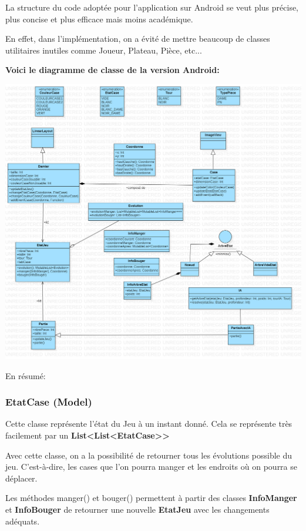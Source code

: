 \documentclass{article}
\begin{document}
La structure du code adoptée pour l'application sur Android se veut plus précise, plus concise et plus efficace 
mais moins académique. 

En effet, dans l'implémentation, on a évité de mettre beaucoup de classes utilitaires inutiles
comme Joueur, Plateau, Pièce, etc... 

\textbf{Voici le diagramme de classe de la version Android: }

\begin{center}
  \includegraphics[scale=0.26]{diagramme_android.png}
\end{center}

En résumé:

  \subsubsection{EtatCase (Model)}

  Cette classe représente l'état du Jeu à un instant donné. 
  Cela se représente très facilement par un \textbf{List<List<EtatCase>>}

  Avec cette classe, on a la possibilité de retourner tous les évolutions possible du jeu.
  C'est-à-dire, les cases que l'on pourra manger et les endroits où on pourra se déplacer.

  Les méthodes manger() et bouger() permettent à partir des classes 
  \textbf{InfoManger} et \textbf{InfoBouger} de retourner une nouvelle \textbf{EtatJeu} avec les 
  changements adéquats.
\end{document}

